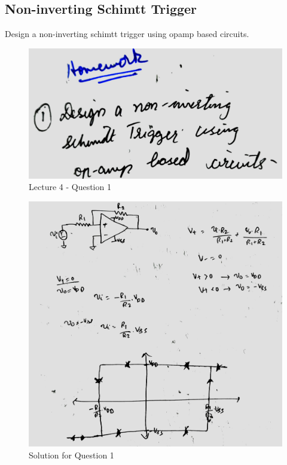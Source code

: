 \documentclass[a4paper]{article}
\begin{document}
\subsection{Non-inverting Schimtt Trigger}
Design a non-inverting schimtt trigger using opamp based circuits.
\begin{figure}
    \centering
    \includegraphics[width=0.8\linewidth]{images/Lec_4_Q_1.jpeg}
    \caption{Lecture 4 - Question 1}
\end{figure}
\begin{figure}
    \centering
    \includegraphics[width=1\linewidth]{images/Lec_4_Q1_Soln.jpeg}
    \caption{Solution for Question 1}
\end{figure}
\end{document}
